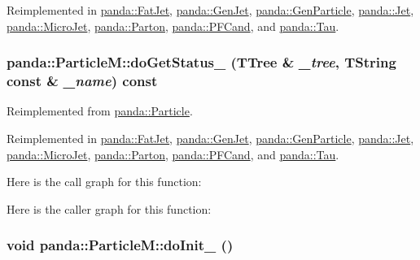 Reimplemented in \hyperlink{classpanda_1_1FatJet_a32dbcd6e7cf31c79aed92220c43daed7}{panda::FatJet}, \hyperlink{classpanda_1_1GenJet_a59196025df6d85eb481e9c47c681e0d7}{panda::GenJet}, \hyperlink{classpanda_1_1GenParticle_aae66df460d70150e146dd95392c7e781}{panda::GenParticle}, \hyperlink{classpanda_1_1Jet_a9f7d21237e7933ee156f5edea6a27696}{panda::Jet}, \hyperlink{classpanda_1_1MicroJet_aa1f5281c41c34033e5ef194f9d846413}{panda::MicroJet}, \hyperlink{classpanda_1_1Parton_a6a1af1903a231bc8db97242dda42979a}{panda::Parton}, \hyperlink{classpanda_1_1PFCand_a0e032b321a5b1003d7639b72a211c7be}{panda::PFCand}, and \hyperlink{classpanda_1_1Tau_a223ddb7af7f072bdb8973676cdb69004}{panda::Tau}.\hypertarget{classpanda_1_1ParticleM_a003a63672058369e9bbea413e055b1c1}{
\subsubsection[{doGetStatus\_\-}]{ panda::ParticleM::doGetStatus\_\- (TTree \& {\em \_\-tree}, \/  TString const \& {\em \_\-name}) const}}
\label{classpanda_1_1ParticleM_a003a63672058369e9bbea413e055b1c1}


Reimplemented from \hyperlink{classpanda_1_1Particle_a7dcbf68bc3e74fdef1e3f3c620fb019a}{panda::Particle}.

Reimplemented in \hyperlink{classpanda_1_1FatJet_a96835f1d5e56985c033cc73029dccef0}{panda::FatJet}, \hyperlink{classpanda_1_1GenJet_a5f514a9289d97bd7b6b8731323143269}{panda::GenJet}, \hyperlink{classpanda_1_1GenParticle_a117dbbc192b9795838cbfbc75f0eceb8}{panda::GenParticle}, \hyperlink{classpanda_1_1Jet_a4ecbac39b42fe464f6346711aed38aba}{panda::Jet}, \hyperlink{classpanda_1_1MicroJet_a2055608524fe0bb8e4fae8ef78e3333e}{panda::MicroJet}, \hyperlink{classpanda_1_1Parton_ab3709c6ae8b88560326291d4d1598c6b}{panda::Parton}, \hyperlink{classpanda_1_1PFCand_a3567f5259663a227698b6e27cc340cb4}{panda::PFCand}, and \hyperlink{classpanda_1_1Tau_ad81f7bd9caddfbc5773bd20f5f4a227f}{panda::Tau}.

Here is the call graph for this function:

Here is the caller graph for this function:\hypertarget{classpanda_1_1ParticleM_ae912914e3970c1fb238589f0ccc783f4}{
\subsubsection[{doInit\_\-}]{\setlength{\rightskip}{0pt plus 5cm}void panda::ParticleM::doInit\_\- ()}}
\label{classpanda_1_1ParticleM_ae912914e3970c1fb238589f0ccc783f4}


